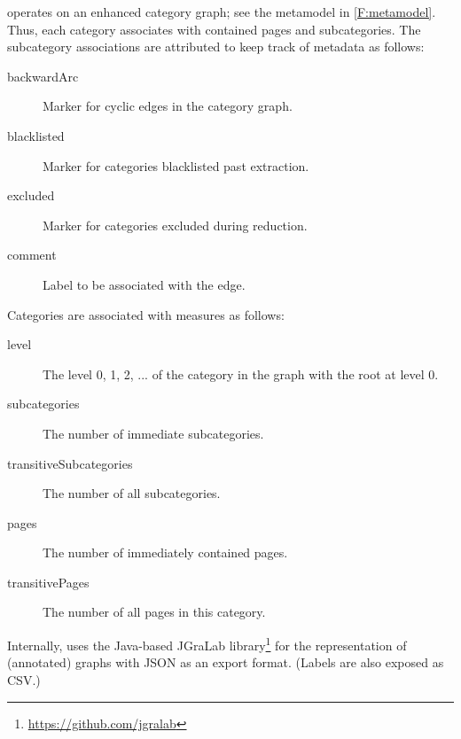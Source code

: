 
\WikiTax{} operates on an enhanced category graph; see the metamodel in \autoref{F:metamodel}. Thus, each category associates with contained pages and subcategories. The subcategory associations are attributed to keep track of metadata as follows: 

\vspace{-22\in}

{\small

\begin{description}
\item[backwardArc] Marker for cyclic edges in the category graph.
\item[blacklisted] Marker for categories blacklisted past extraction.
\item[excluded] Marker for categories excluded during reduction.
\item[comment] Label to be associated with the edge.
\end{description}

}

\vspace{-22\in}

\noindent
Categories are associated with measures as follows:

\vspace{-22\in}

{\small

\begin{description}
\item[level] The level 0, 1, 2, ... of the category in the graph with the root at level 0.
\item[subcategories] The number of immediate subcategories.
\item[transitiveSubcategories] The number of all subcategories.
\item[pages] The number of immediately contained pages.
\item[transitivePages] The number of all pages in this category.
\end{description}

}

\vspace{-22\in}

\noindent
Internally, \WikiTax{} uses the Java-based JGraLab library\footnote{\url{https://github.com/jgralab}} for the representation of (annotated) graphs with JSON as an export format. (Labels are also exposed as CSV.)

